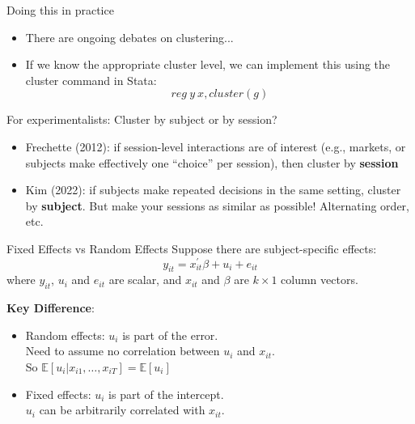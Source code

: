 \begin{frame}{Doing this in practice}
\begin{itemize}
    \item There are ongoing debates on clustering...
    \item If we know the appropriate cluster level, we can implement this using the cluster command in Stata:
$$reg ~y ~x, cluster(g)$$
\end{itemize}
\br
For experimentalists: Cluster by subject or by session?
\begin{itemize}
    \item Frechette (2012): if session-level interactions are of interest (e.g., markets, or subjects make effectively one ``choice'' per session), then cluster by \textbf{session}
    \item Kim (2022): if subjects make repeated decisions in the same setting, cluster by \textbf{subject}. But make your sessions as similar as possible! Alternating order, etc.
\end{itemize}
\end{frame}

\begin{frame}{Fixed Effects vs Random Effects}
    Suppose there are subject-specific effects:
    $$y_{it}=x^{\prime}_{it}\beta+u_{i}+e_{it}$$
    where $y_{it}$, $u_{i}$ and $e_{it}$ are scalar, and $x_{it}$ and $\beta$ are $k\times 1$ column vectors.

\textbf{Key Difference}:
    \begin{itemize}
        \item Random effects: $u_i$ is part of the error.\\
        Need to assume no correlation between $u_{i}$ and $x_{it}$.\\
        So $\mathbb{E}[u_{i}|x_{i1},\ldots,x_{iT}]=\mathbb{E}[u_{i}]$
        \item Fixed effects: $u_i$ is part of the intercept.\\ 
        $u_{i}$ can be arbitrarily correlated with $x_{it}$.
    \end{itemize}
\end{frame}

